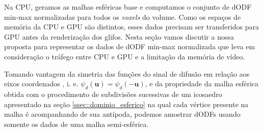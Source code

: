 
Na CPU, geramos as malhas esféricas base e computamos o conjunto de dODF min-max normalizadas para todos os \textit{voxels} do volume. Como os espaços de memória da CPU e GPU são distintos, esses dados precisam ser transferidos para GPU antes da renderização dos glifos. Nesta seção vamos discutir a nossa proposta para representar os dados de dODF min-max normalizada que leva em consideração o tráfego entre CPU e GPU e a limitação da memória de vídeo.



Tomando vantagem da simetria das funções do sinal de difusão em relação aos eixos coordenados \cite{descoteaux2015}, i. e. $\psi_d(\mathbf{u}) = \psi_d(-\mathbf{u})$, e da propriedade da malha esférica obtida com o procedimento de subdivisões sucessivas de um icosaedro apresentado na seção \ref{ssec::dominio_esferico} na qual cada vértice presente na malha é acompanhando de sua antípoda, podemos amostrar dODFs usando somente os dados de uma malha semi-esférica.

